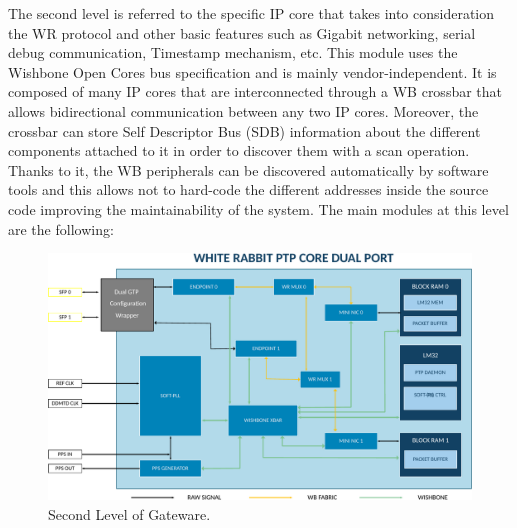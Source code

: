 The second level is referred to the specific IP core that takes into consideration the WR protocol and other basic features such as Gigabit networking, serial debug communication, Timestamp mechanism, etc. This module uses the Wishbone Open Cores bus specification and is mainly vendor-independent. It is composed of many IP cores that are interconnected through a WB crossbar that allows bidirectional communication between any two IP cores. Moreover, the crossbar can store Self Descriptor Bus (SDB) information about the different components attached to it in order to discover them with a scan operation. Thanks to it, the WB peripherals can be discovered automatically by software tools and this allows not to hard-code the different addresses inside the source code improving the maintainability of the system. The main modules at this level are the following:


\begin{figure}[H]
	\centering
	\includegraphics[scale=0.4]{img/wrpc_dp-eps-converted-to}
	\caption{Second Level of Gateware.}
	\label{fig:gateware_second_level}
\end{figure}


